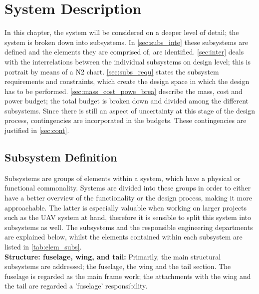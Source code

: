 \chapter{System Description}
\setlength{\parindent}{15pt}
\label{ch:syst_desc}

In this chapter, the system will be considered on a deeper level of detail; the system is broken down into subsystems. In \autoref{sec:subs_inte} these subsystems are defined and the elements they are comprised of, are identified. \autoref{sec:inter} deals with the interrelations between the individual subsystems on design level; this is portrait by means of a N2 chart. \autoref{sec:subs_requ} states the subsystem requirements and constraints, which create the design space in which the design has to be performed. \autoref{sec:mass_cost_powe_brea} describe the mass, cost and power budget; the total budget is broken down and divided among the different subsystems. Since there is still an aspect of uncertainty at this stage of the design process, contingencies are incorporated in the budgets. These contingencies are justified in \autoref{sec:cont}.

\section{Subsystem Definition}
\label{sec:subs_inte}

Subsystems are groups of elements within a system, which have a physical or functional commonality. Systems are divided into these groups in order to either have a better overview of the functionality or the design process, making it more approachable. The latter is especially valuable when working on larger projects such as the UAV system at hand, therefore it is sensible to split this system into subsystems as well. The subsystems and the responsible engineering departments are explained below, whilst the elements contained within each subsystem are listed in \autoref{tab:elem_subs}. \\


\noindent \textbf{Structure: fuselage, wing, and tail:} Primarily, the main structural subsystems are addressed; the fuselage, the wing and the tail section. The fuselage is regarded as the main frame work; the attachments with the wing and the tail are regarded a 'fuselage' responsibility.

